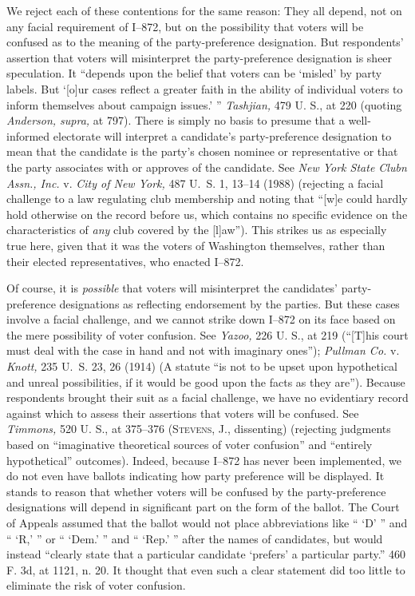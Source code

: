   We reject each of these contentions for the same reason: They
all depend, not on any facial requirement of I--872, but on the
possibility that voters will be confused as to the meaning of the
party-preference designation. But respondents' assertion that voters
will misinterpret the party-preference designation is sheer speculation.
It ``depends upon the belief that voters can be ‘misled' by
party labels. But ‘[o]ur cases reflect a greater faith in the
ability of individual voters to inform themselves about campaign
issues.' '' \emph{Tashjian,} 479 U. S., at 220 (quoting \emph{Anderson,
supra,} at 797). There is simply no basis to presume that a
well-informed electorate will interpret a candidate's party-preference
designation to mean that the candidate is the party's chosen nominee
or representative or that the party associates with or approves of the
candidate. See \emph{New York State Clubn Assn., Inc.} v. \emph{City of
New York,} 487 U.~S. 1, 13--14 (1988) \newpage  (rejecting a facial
challenge to a law regulating club membership and noting that ``[w]e
could hardly hold otherwise on the record before us, which contains no
specific evidence on the characteristics of \emph{any} club covered by
the [l]aw''). This strikes us as especially true here, given that
it was the voters of Washington themselves, rather than their elected
representatives, who enacted I--872.

  Of course, it is \emph{possible} that voters will misinterpret the
candidates' party-preference designations as reflecting endorsement by
the parties. But these cases involve a facial challenge, and we cannot
strike down I--872 on its face based on the mere possibility of voter
confusion. See \emph{Yazoo,} 226 U. S., at 219 (``[T]his court must deal
with the case in hand and not with imaginary ones''); \emph{Pullman Co.}
v. \emph{Knott,} 235 U.~S. 23, 26 (1914) (A statute ``is not to be upset
upon hypothetical and unreal possibilities, if it would be good upon the
facts as they are''). Because respondents brought their suit as a
facial challenge, we have no evidentiary record against which to assess
their assertions that voters will be confused. See \emph{Timmons,} 520
U. S., at 375--376 (\textsc{Stevens,} J., dissenting) (rejecting judgments
based on ``imaginative theoretical sources of voter confusion'' and
``entirely hypothetical'' outcomes). Indeed, because I--872 has
never been implemented, we do not even have ballots indicating how party
preference will be displayed. It stands to reason that whether voters
will be confused by the party-preference designations will depend in
significant part on the form of the ballot. The Court of Appeals assumed
that the ballot would not place abbreviations like `` ‘D' '' and
`` ‘R,' '' or `` ‘Dem.' '' and `` ‘Rep.' '' after
the names of candidates, but would instead ``clearly state that a
particular candidate ‘prefers' a particular party.'' 460 F. 3d,
at 1121, n. 20. It thought that even such a clear statement did too
little to eliminate the risk of voter confusion.

